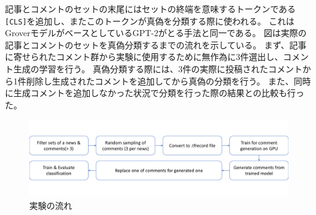 記事とコメントのセットの末尾にはセットの終端を意味するトークンである\texttt{[CLS]}を追加し、またこのトークンが真偽を分類する際に使われる。
これはGroverモデルがベースとしているGPT-2がとる手法\cite{Radford_GPT2}と同一である。
図\label{fig:process}は実際の記事とコメントのセットを真偽分類するまでの流れを示している。
まず、記事に寄せられたコメント群から実験に使用するために無作為に3件選出し、コメント生成の学習を行う。
真偽分類する際には、3件の実際に投稿されたコメントから1件削除し生成されたコメントを追加してから真偽の分類を行う。
また、同時に生成コメントを追加しなかった状況で分類を行った際の結果との比較も行った。

\begin{figure}[t]
    \centering
    \includegraphics[width=0.8\linewidth,pagebox=cropbox,clip]{images/fig_process.pdf}
    \caption{実験の流れ}
    \label{fig:process}
\end{figure}
